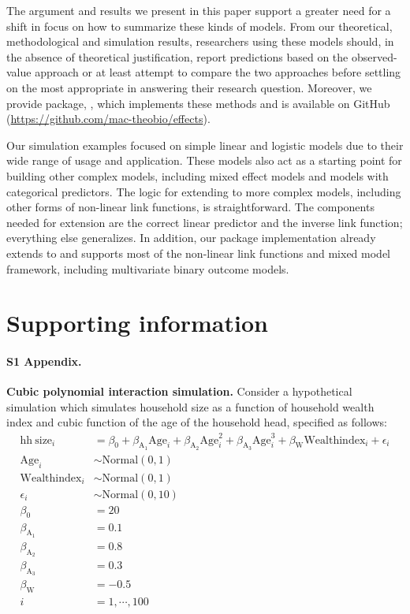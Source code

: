 The argument and results we present in this paper support a greater need for a shift in focus on how to summarize these kinds of models. From our theoretical, methodological and simulation results, researchers using these models should, in the absence of theoretical justification, report predictions based on the observed-value approach or at least attempt to compare the two approaches before settling on the most appropriate in answering their research question. Moreover, we provide  package, , which implements these methods and is available on GitHub (\href{https://github.com/mac-theobio/effects}{https://github.com/mac-theobio/effects}).

Our simulation examples focused on simple linear and logistic models due to their wide range of usage and application. These models also act as a starting point for building other complex models, including mixed effect models and models with categorical predictors. The logic for extending to more complex models, including other forms of non-linear link functions, is straightforward. The components needed for extension are the correct linear predictor and the inverse link function; everything else generalizes. In addition, our  package implementation already extends to and supports most of the non-linear link functions and mixed model framework, including multivariate binary outcome models.

\section{Supporting information}

\paragraph*{S1 Appendix.}
\label{S1_Appendix}
{\bf Cubic polynomial interaction simulation.} Consider a hypothetical simulation which simulates household size as a function of household wealth index and cubic function of the age of the household head, specified as follows:
%
\begin{align}\label{sim:lm_cubic}
\mathrm{hh~size}_i &= \beta_0 + \beta_{\mathrm{A_1}}\mathrm{Age}_i + \beta_{\mathrm{A_2}}\mathrm{Age}^2_i + \beta_{\mathrm{A_3}}\mathrm{Age}^3_i + \beta_{\mathrm{W}}\mathrm{Wealthindex}_i + \epsilon_i \nonumber\\
\mathrm{Age}_i &\sim \mathrm{Normal}(0, 1) \nonumber\\
\mathrm{Wealthindex}_i &\sim \mathrm{Normal}(0, 1) \nonumber\\
\epsilon_i &\sim \mathrm{Normal}(0, 10) \nonumber\\
\beta_0 &= 20 \nonumber\\
\beta_{\mathrm{A}_1} &= 0.1 \nonumber\\
\beta_{\mathrm{A}_2} &= 0.8 \nonumber\\
\beta_{\mathrm{A}_3} &= 0.3 \nonumber\\
\beta_{\mathrm{W}} &= -0.5 \nonumber\\
i &= 1,\cdots, 100
\end{align}


